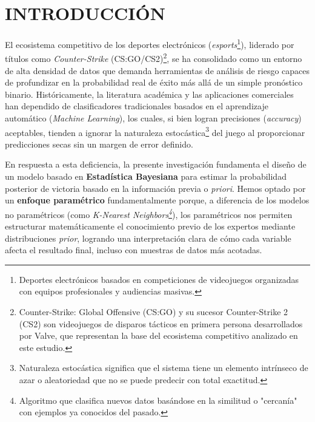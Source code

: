 \documentclass[twocolumn,10pt]{article}
\begin{document}
\thispagestyle{fancyplain} %

\section{INTRODUCCIÓN}

\justifying
El ecosistema competitivo de los deportes electrónicos (\textit{esports}\footnote{Deportes electrónicos basados en competiciones de videojuegos organizadas con equipos profesionales y audiencias masivas.}), liderado por títulos como \textit{Counter-Strike} (CS:GO/CS2)\footnote{Counter-Strike: Global Offensive (CS:GO) y su sucesor Counter-Strike 2 (CS2) son videojuegos de disparos tácticos en primera persona desarrollados por Valve, que representan la base del ecosistema competitivo analizado en este estudio.}, se ha consolidado como un entorno de alta densidad de datos que demanda herramientas de análisis de riesgo capaces de profundizar en la probabilidad real de éxito más allá de un simple pronóstico binario. Históricamente, la literatura académica y las aplicaciones comerciales han dependido de clasificadores tradicionales basados en el aprendizaje automático (\textit{Machine Learning}), los cuales, si bien logran precisiones (\textit{accuracy}) aceptables, tienden a ignorar la naturaleza estocástica\footnote{Naturaleza estocástica significa que el sistema tiene un elemento intrínseco de azar o aleatoriedad que no se puede predecir con total exactitud.} del juego al proporcionar predicciones secas sin un margen de error definido. 

En respuesta a esta deficiencia, la presente investigación fundamenta el diseño de un modelo basado en \textbf{Estadística Bayesiana} para estimar la probabilidad posterior de victoria basado en la información previa o \textit{priori}. Hemos optado por un \textbf{enfoque paramétrico} fundamentalmente porque, a diferencia de los modelos no paramétricos (como \textit{K-Nearest Neighbors\footnote{Algoritmo que clasifica nuevos datos basándose en la similitud o "cercanía" con ejemplos ya conocidos del pasado.}}), los paramétricos nos permiten estructurar matemáticamente el conocimiento previo de los expertos mediante distribuciones \textit{prior}, logrando una interpretación clara de cómo cada variable afecta el resultado final, incluso con muestras de datos más acotadas.
\end{document}
